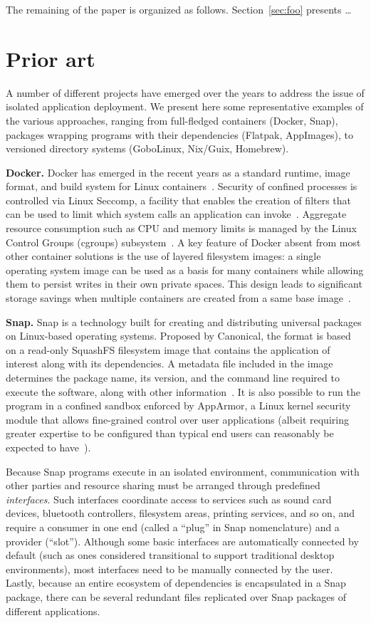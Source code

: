 \documentclass[sigplan, anonymous, 10pt]{acmart}
\begin{document}
The remaining of the paper is organized as follows. Section~\ref{sec:foo} presents \ldots

\section{Prior art}
A number of different projects have emerged over the years to address the issue of
isolated application deployment. We present here some representative examples of
the various approaches, ranging from full-fledged containers (Docker, Snap),
packages wrapping programs with their dependencies (Flatpak, AppImages),
to versioned directory systems (GoboLinux, Nix/Guix, Homebrew).

\textbf{Docker.}
Docker has emerged in the recent years as a standard runtime, image format, and build
system for Linux containers~\cite{fink2014:docker}. Security of confined processes is
controlled via Linux Seccomp, a facility that enables the creation of filters that can
be used to limit which system calls an application can invoke~\cite{lwn2015:seccomp}.
Aggregate resource consumption such as CPU and memory limits is managed by the Linux
Control Groups (cgroups) subsystem~\cite{brown2014:cgroups}. A key feature of Docker
absent from most other container solutions is the use of layered filesystem images:
a single operating system image can be used as a basis for many containers while allowing
them to persist writes in their own private spaces. This design leads to significant
storage savings when multiple containers are created from a same base
image~\cite{felter2015:comparison}.

\textbf{Snap.}
Snap is a technology built for creating and distributing universal packages on Linux-based
operating systems. Proposed by Canonical, the format is based on a read-only SquashFS filesystem
image that contains the application of interest along with its dependencies. A metadata file
included in the image determines the package name, its version, and the command line required
to execute the software, along with other information~\cite{canonical2011:snapcraft}.
It is also possible to run the program in a confined sandbox enforced by AppArmor, a Linux kernel
security module that allows fine-grained control over user applications (albeit requiring greater
expertise to be configured than typical end users can reasonably be expected to
have~\cite{schreuders2011:empowering}).

Because Snap programs execute in an isolated environment, communication with other parties
and resource sharing must be arranged through predefined \emph{interfaces}. Such interfaces
coordinate access to services such as sound card devices, bluetooth controllers, filesystem
areas, printing services, and so on, and require a consumer in one end (called a ``plug''
in Snap nomenclature) and a provider (``slot''). Although some basic interfaces are automatically
connected by default (such as ones considered transitional to support traditional desktop
environments), most interfaces need to be manually connected by the user. Lastly, because
an entire ecosystem of dependencies is encapsulated in a Snap package, there can be several
redundant files replicated over Snap packages of different applications.
\end{document}
